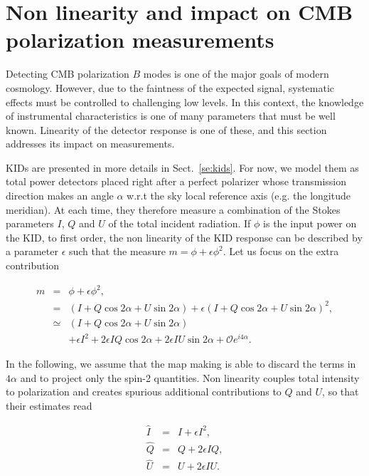
\section{Non linearity and impact on CMB polarization measurements}
\label{sec:cmb}

Detecting CMB polarization $B$ modes is one of the major goals of modern
cosmology. However, due to the faintness of the expected signal, systematic
effects must be controlled to challenging low levels. In this context, the
knowledge of instrumental characteristics is one of many parameters that must be
well known. Linearity of the detector response is one of these,
and this section addresses its impact on measurements.

KIDs are presented in more details in Sect.~\ref{se:kids}. For now, we model
them as total power detectors placed right after a perfect polarizer whose
transmission direction makes an angle $\alpha$ w.r.t the sky local reference
axis (e.g. the longitude meridian). At each time, they therefore measure a
combination of the Stokes parameters $I$, $Q$ and $U$ of the total incident
radiation. If $\phi$ is the input power on the KID, to first order, the non
linearity of the KID response can be described by a parameter $\epsilon$ such
that the measure $m=\phi + \epsilon\phi^2$. Let us focus on the
extra contribution

\begin{eqnarray}
m &=& \phi + \epsilon\phi^2, \nonumber \\
&=& (I+Q\cos2\alpha+U\sin2\alpha) + \epsilon(I+Q\cos2\alpha+U\sin2\alpha)^2, \nonumber\\
 &\simeq & (I+Q\cos2\alpha+U\sin2\alpha) \nonumber \\
&&+\epsilon I^{2} + 2\epsilon IQ\cos2\alpha + 
2\epsilon IU \sin2\alpha + \mathcal{O}e^{i4\alpha}.
\label{eq:eq-NL}
\end{eqnarray}

In the following, we assume that the map making is able to discard the terms in
$4\alpha$ and to project only the spin-2 quantities. Non linearity couples total
intensity to polarization and creates spurious additional contributions to $Q$
and $U$, so that their estimates read

\begin{eqnarray}
\hat{I} &=& I + \epsilon I^2,\\
\hat{Q} &=& Q + 2\epsilon IQ,\\
\hat{U} &=& U + 2\epsilon IU.
\end{eqnarray}


